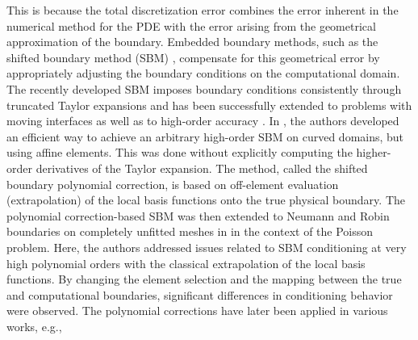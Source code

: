 \documentclass{article}
\begin{document}
This is because the total discretization error combines the error inherent in the numerical method for the PDE with the error arising from the geometrical approximation of the boundary. Embedded boundary methods, such as the shifted boundary method (SBM) \cite{main2018shifted,song2018shifted}, compensate for this geometrical error by appropriately adjusting the boundary conditions on the computational domain. The recently developed SBM imposes boundary conditions consistently through truncated Taylor expansions and has been successfully extended to problems with moving interfaces \cite{atallah2025high, colomes2026generalized, ciallella2022extrapolated,carlier2023enriched} as well as to high-order accuracy \cite{atallah2022high, ciallella2023shifted, collins2023penalty}. In \cite{ciallella2023shifted}, the authors developed an efficient way to achieve an arbitrary high-order SBM on curved domains, but using affine elements. This was done without explicitly computing the higher-order derivatives of the Taylor expansion. The method, called the shifted boundary polynomial correction, is based on off-element evaluation (extrapolation) of the local basis functions onto the true physical boundary. The polynomial correction-based SBM was then extended to Neumann and Robin boundaries on completely unfitted meshes in \cite{visbech2025spectral} in the context of the Poisson problem. Here, the authors addressed issues related to SBM conditioning at very high polynomial orders with the classical extrapolation of the local basis functions. By changing the element selection and the mapping between the true and computational boundaries, significant differences in conditioning behavior were observed. The polynomial corrections have later been applied in various works, e.g., \cite{collins2026gap, BOSCHERI2025114215, visbech2026recent}
%
\end{document}

